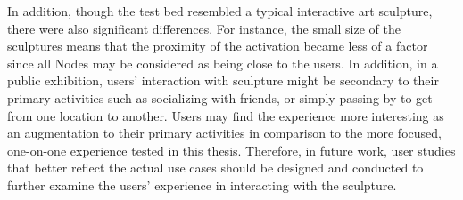 In addition, though the test bed resembled a typical interactive art sculpture, there were also significant differences. For instance, the small size of the sculptures means that the proximity of the activation became less of a factor since all Nodes may be considered as being close to the users. In addition, in a public exhibition, users' interaction with sculpture might be secondary to their primary activities such as socializing with friends, or simply passing by to get from one location to another. Users may find the experience more interesting as an augmentation to their primary activities in comparison to the more focused, one-on-one experience tested in this thesis. Therefore, in future work, user studies that better reflect the actual use cases should be designed and conducted to further examine the users' experience in interacting with the sculpture.

